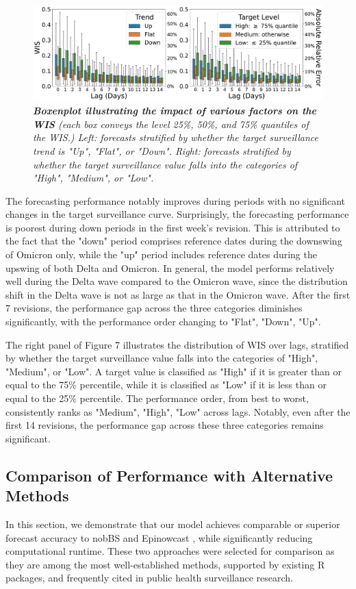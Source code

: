 \begin{figure}[h!]
    \centering
    \includegraphics[width=\textwidth]{figs/experiment_fraction_result_factors.pdf}
    \caption{\emph{\textbf{Boxenplot illustrating the impact of various factors on the WIS} (each box conveys the level 25\%, 50\%, and 75\% quantiles of the WIS.) Left: forecasts stratified by whether the target surveillance trend is "Up", "Flat", or "Down". Right: forecasts stratified by whether the target surveillance value falls into the categories of "High", "Medium", or "Low".}}
\end{figure}

The forecasting performance notably improves during periods with no significant changes in the target surveillance curve. Surprisingly, the forecasting performance is poorest during down periods in the first week's revision. This is attributed to the fact that the "down" period comprises reference dates during the downswing of Omicron only, while the "up" period includes reference dates during the upswing of both Delta and Omicron. In general, the model performs relatively well during the Delta wave compared to the Omicron wave, since the distribution shift in the Delta wave is not as large as that in the Omicron wave. After the first 7 revisions, the performance gap across the three categories diminishes significantly, with the performance order changing to "Flat", "Down", "Up".

The right panel of Figure 7 illustrates the distribution of WIS over lags, stratified by whether the target surveillance value falls into the categories of "High", "Medium", or "Low". A target value is classified as "High" if it is greater than or equal to the 75\% percentile, while it is classified as "Low" if it is less than or equal to the 25\% percentile. The performance order, from best to worst, consistently ranks as "Medium", "High", "Low" across lags. Notably, even after the first 14 revisions, the performance gap across these three categories remains significant.


\subsection{Comparison of Performance with Alternative Methods}
In this section, we demonstrate that our model achieves comparable or superior forecast accuracy to nobBS \cite{McGough2020} and Epinowcast \cite{epinowcast}, while significantly reducing computational runtime. These two approaches were selected for comparison as they are among the most well-established methods, supported by existing R packages, and frequently cited in public health surveillance research.

